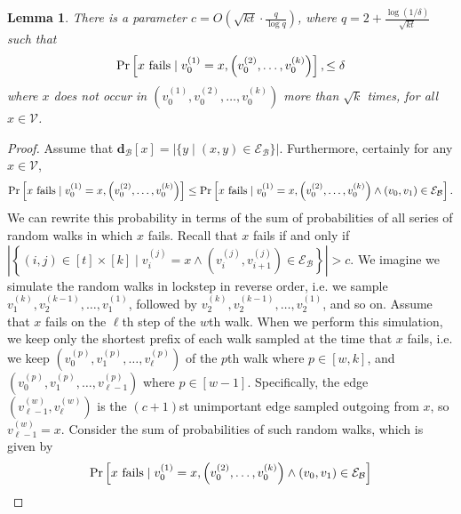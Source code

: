 \documentclass{report}
\newtheorem{lemma}[theorem]{Lemma}
\begin{document}
\begin{lemma} \label{lem:rw:setc}
There is a parameter $c = O\left (\sqrt{kt} \cdot \frac{q}{\log q} \right )$, where $q = 2 + \frac{\log(1/\delta)}{\sqrt{kt}}$ such that 
%
\begin{equation*}
\Pr \left [\textnormal{$x$ fails} \mid v_0^{(1)} = x, \left (v_0^{(2)}, \dots, v_0^{(k)} \right ) \right ], \leq \delta
\end{equation*}
%
where $x$ does not occur in $\left ( v_0^{(1)}, v_0^{(2)}, \dots, v_0^{(k)} \right )$ more than $\sqrt{k}$ times, 
for all $x \in \mathcal{V}$.
\end{lemma}
%
\begin{proof}
Assume that $\mathbf{d}_\mathcal{B}[x] = |\{y \mid (x, y) \in \mathcal{E}_\mathcal{B}\}|$.
Furthermore, certainly for any $x \in \mathcal{V}$,
%
\begin{equation*}
\Pr \left [\textnormal{$x$ fails} \mid v_0^{(1)} = x, \left (v_0^{(2)}, \dots, v_0^{(k)} \right ) \right ]
\leq 
\Pr \left [\textnormal{$x$ fails} \mid v_0^{(1)} = x, \left (v_0^{(2)}, \dots, v_0^{(k)} \right ) \wedge (v_0, v_1) \in \mathcal{E}_\mathcal{B} \right ].
\end{equation*}
%
We can rewrite this probability in terms of the sum of probabilities of all series of random walks in which $x$ fails.  
Recall that $x$ fails if and only if 
$\left | \left \{ (i,j) \in [t] \times [k] \mid v_i^{(j)} = x 
	\wedge \left ( v_i^{(j)}, v_{i+1}^{(j)} \right ) \in \mathcal{E}_\mathcal{B} \right \} \right | > c$.
We imagine we simulate the random walks in lockstep in reverse order, i.e. we sample $v_1^{(k)}, v_2^{(k-1)}, \dots, v_1^{(1)}$, followed by $v_2^{(k)}, v_2^{(k-1)}, \dots, v_2^{(1)}$, and so on.
Assume that $x$ fails on the $\ell$th step of the $w$th walk.
When we perform this simulation, we keep only the shortest prefix of each walk sampled at the time that $x$ fails, i.e. we keep $\left (v_0^{(p)}, v_1^{(p)},  \dots, v_\ell^{(p)} \right )$ of the $p$th walk where $p \in [w, k]$, and $\left (v_0^{(p)}, v_1^{(p)},  \dots, v_{\ell-1}^{(p)} \right )$ where $p \in [w-1]$. 
Specifically, the edge $\left ( v_{\ell-1}^{(w)}, v_{\ell}^{(w)} \right )$ is the $(c+1)$st unimportant edge sampled outgoing from $x$, so $v_{\ell-1}^{(w)} = x$.
Consider the sum of probabilities of such random walks, which is given by
%
\begin{align}
\nonumber
\Pr& \left [\textnormal{$x$ fails} \mid v_0^{(1)} = x, \left (v_0^{(2)}, \dots, v_0^{(k)} \right ) \wedge (v_0, v_1) \in \mathcal{E}_\mathcal{B} \right ]
\\

\end{align}
\end{proof}
\end{document}
